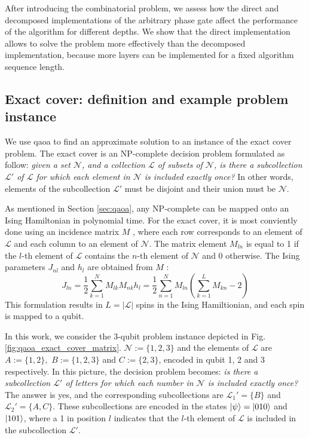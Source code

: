 After introducing the combinatorial problem, we assess how the direct and decomposed implementations of the arbitrary phase gate affect the performance of the algorithm for different depths. We show that the direct implementation allows to solve the problem more effectively than the decomposed implementation, because more layers can be implemented for a fixed algorithm sequence length. 

\subsection{Exact cover: definition and example problem instance}
We use \gls{qaoa} to find an approximate solution to an instance of the exact cover problem. The exact cover \cite{Karp1972ReducibilityProblems} is an NP-complete \cite{GareyM1990} decision problem formulated as follow: \textit{given a set $\mathcal{N}$, and a collection $\mathcal{L}$ of subsets of $\mathcal{N}$, is there a subcollection $\mathcal{L}'$ of $\mathcal{L}$ for which each element in $\mathcal{N}$ is included exactly once?} In other words, elements of the subcollection $\mathcal{L}'$ must be disjoint and their union must be $\mathcal{N}$.

As mentioned in Section \ref{sec:qaoa}, any NP-complete can be mapped onto an Ising Hamiltonian in polynomial time. For the exact cover, it is most conviently done using an incidence matrix $M$ \cite{WeissteinIncidenceMatrix}, where each row corresponds to an element of $\mathcal{L}$ and each column to an element of $\mathcal{N}$. The matrix element $M_{ln}$ is equal to 1 if the $l$-th element of $\mathcal{L}$ contains the $n$-th element of $\mathcal{N}$ and 0 otherwise.
The Ising parameters $J_{nl}$ and $h_l$ are obtained from $M$ \cite{Lucas2014IsingProblems, Vikstal2019ApplyingProblem}:
\begin{subequations}
\begin{equation}
    J_{l n}=\frac{1}{2} \sum_{k=1}^{N} M_{l k} M_{n k}
\end{equation}
\begin{equation}
h_{l}=\frac{1}{2} \sum_{n=1}^{N} M_{l n}\left(\sum_{k=1}^{L} M_{k n}-2\right)
\end{equation}
\end{subequations}
This formulation results in $L = |\mathcal{L}|$ spins in the Ising Hamiltionian, and each spin is mapped to a qubit. 

In this work, we consider the 3-qubit problem instance depicted in Fig. \ref{fig:qaoa_exact_cover_matrix}.  $\mathcal{N} := \{1,2,3\}$ and the elements of $\mathcal{L}$ are $A := \{1,2\},\,\, B := \{1,2,3\}$ and $C := \{2,3\}$, encoded in qubit 1, 2 and 3 respectively. In this picture, the decision problem becomes: \textit{is there a subcollection $\mathcal{L}'$ of letters for which each number in $\mathcal{N}$ is included exactly once?} The answer is yes, and the corresponding subcollections are $\mathcal{L}_1' = \{B\}$ and $\mathcal{L}_2' = \{A,C\}$. These subcollections are encoded in the states $\ket{\psi}=\ket{010}$ and $\ket{101}$, where a 1 in position $l$ indicates that the $l$-th element of $\mathcal{L}$ is included in the subcollection $\mathcal{L'}$.

